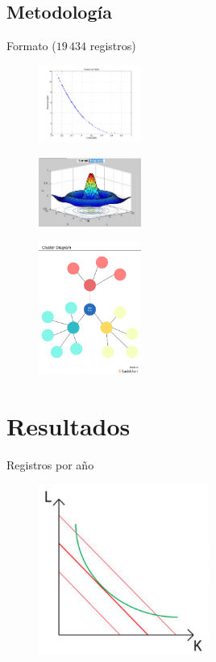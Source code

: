 \documentclass[9pt]{beamer}
\begin{document}
\subsection{Metodología}

	\begin{frame}{Formato ($19\, 434$ registros)}
		\begin{figure}
			\includegraphics[width=0.3\textwidth,left]{logaritmica} 			
		  \end{figure}
		  
		\begin{figure}
			\includegraphics[width=0.3\textwidth]{curvas}
		\end{figure}
		\begin{figure}
			\includegraphics[width=0.3\textwidth, right]{red}
		\end{figure}
		
		  
	\end{frame}

\section{Resultados}
	\begin{frame}{Registros por año} 
		\begin{figure}
			\includegraphics[width=0.5\textwidth]{grafico.jpg}
		\end{figure}
	\end{frame}
\end{document}
